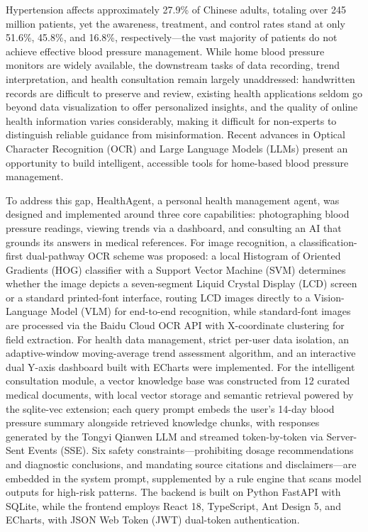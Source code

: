 \documentclass[zihao=-4,a4paper]{ctexart}
\numberwithin{figure}{section}
\numberwithin{table}{section}
\begin{document}
{
Hypertension affects approximately 27.9\% of Chinese adults, totaling over 245 million patients, yet the awareness, treatment, and control rates stand at only 51.6\%, 45.8\%, and 16.8\%, respectively---the vast majority of patients do not achieve effective blood pressure management. While home blood pressure monitors are widely available, the downstream tasks of data recording, trend interpretation, and health consultation remain largely unaddressed: handwritten records are difficult to preserve and review, existing health applications seldom go beyond data visualization to offer personalized insights, and the quality of online health information varies considerably, making it difficult for non-experts to distinguish reliable guidance from misinformation. Recent advances in Optical Character Recognition (OCR) and Large Language Models (LLMs) present an opportunity to build intelligent, accessible tools for home-based blood pressure management.

To address this gap, HealthAgent, a personal health management agent, was designed and implemented around three core capabilities: photographing blood pressure readings, viewing trends via a dashboard, and consulting an AI that grounds its answers in medical references. For image recognition, a classification-first dual-pathway OCR scheme was proposed: a local Histogram of Oriented Gradients (HOG) classifier with a Support Vector Machine (SVM) determines whether the image depicts a seven-segment Liquid Crystal Display (LCD) screen or a standard printed-font interface, routing LCD images directly to a Vision-Language Model (VLM) for end-to-end recognition, while standard-font images are processed via the Baidu Cloud OCR API with X-coordinate clustering for field extraction. For health data management, strict per-user data isolation, an adaptive-window moving-average trend assessment algorithm, and an interactive dual Y-axis dashboard built with ECharts were implemented. For the intelligent consultation module, a vector knowledge base was constructed from 12 curated medical documents, with local vector storage and semantic retrieval powered by the sqlite-vec extension; each query prompt embeds the user's 14-day blood pressure summary alongside retrieved knowledge chunks, with responses generated by the Tongyi Qianwen LLM and streamed token-by-token via Server-Sent Events (SSE). Six safety constraints---prohibiting dosage recommendations and diagnostic conclusions, and mandating source citations and disclaimers---are embedded in the system prompt, supplemented by a rule engine that scans model outputs for high-risk patterns. The backend is built on Python FastAPI with SQLite, while the frontend employs React 18, TypeScript, Ant Design 5, and ECharts, with JSON Web Token (JWT) dual-token authentication.

}
\end{document}
